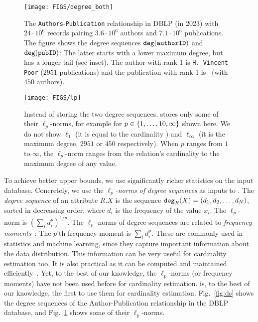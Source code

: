 \begin{figure}[t]
\begin{minipage}{0.48\textwidth}
    \texttt{[image: FIGS/degree\_both]}
    \caption{The \texttt{Authors}-\texttt{Publication} relationship in 
      DBLP (in 2023) with $24\cdot 10^6$ records pairing $3.6\cdot 10^6$ 
      authors and $7.1\cdot 10^6$ publications. The figure shows the 
      degree sequences $\texttt{deg}(\texttt{authorID})$ and 
      $\texttt{deg}(\texttt{pubID})$: The latter starts with a lower maximum degree, but 
      has a longer tail (see inset). The author with rank 1 is 
      \texttt{H. Vincent Poor} ($2951$ publications) and the publication 
      with rank 1 is~\cite{DBLP:journals/tmlr/SrivastavaRRSAF23} (with 
      $450$ authors).}
    \label{fig:ds}
\end{minipage}
\hfill
\begin{minipage}{0.48\textwidth}
    \texttt{[image: FIGS/lp]}
    \caption{Instead of storing the two degree sequences, \system stores 
      only some of their $\ell_p$-norms, for example for $p\in \{1,\ldots, 10,\infty\}$ 
      shown here. We do not show $\ell_1$ (it is equal to the cardinality 
      ) and $\ell_\infty$ (it is the maximum degree, 
      $2951$ or $450$ respectively). When $p$ ranges from $1$ to $\infty$, the 
      $\ell_p$-norm ranges from the relation's cardinality to the maximum 
      degree of any value.}
    \label{fig:lp}
\end{minipage}
\end{figure}

To achieve better upper bounds, we use significantly richer statistics
on the input database.  Concretely, we use the {\em $\ell_p$-norms of
  degree sequences} as inputs to \system.  The \emph{degree sequence}
of an attribute $R.X$ is the sequence
$\texttt{deg}_R(X) = (d_1, d_2, \ldots, d_N)$, sorted in decreasing order,
where $d_i$ is the frequency of the value $x_i$.  The $\ell_p$-norm is
$\left(\sum_i d_i^p\right)^{1/p}$.  The $\ell_p$-norms of degree
sequences are related to \emph{frequency moments}~\cite{DBLP:conf/stoc/AlonMS96}: 
The $p$'th frequency moment is $\sum_i d_i^p$. These are 
commonly used in statistics and machine learning, since they
capture important information about the data distribution.  This
information can be very useful for cardinality estimation too. 
It is also practical as it can be computed and maintained efficiently~\cite{DBLP:conf/stoc/AlonMS96}. 
Yet, to the best of our knowledge, the $\ell_p$-norms (or frequency moments)
have not been used before for cardinality estimation.  \system is, to
the best of our knowledge, the first to use them for cardinality
estimation.
Fig.~\ref{fig:ds} shows the degree sequences of the
Author-Publication relationship in the DBLP database, and
Fig.~\ref{fig:lp} shows some of their $\ell_p$-norms. 


